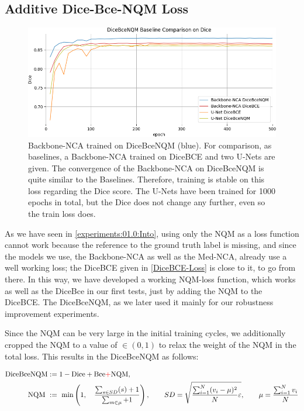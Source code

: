 \subsection{Additive Dice-Bce-NQM Loss}
\label{experiments:02.1:diceBce+NQM}
\begin{figure}[h!]
    \vspace{0.5cm}
    \centering
        \includegraphics[width=\linewidth]{Graphics/Experiments/2.1_inverted_freeAxes_Loss_DiceLoss()_test_mask0.png}
        \caption{Backbone-NCA trained on DiceBceNQM (blue). For comparison, as baselines, a Backbone-NCA trained on DiceBCE and two U-Nets are given. The convergence of the Backbone-NCA on DiceBceNQM is quite similar to the Baselines. Therefore, training is stable on this loss regarding the Dice score. The U-Nets have been trained for 1000 epochs in total, but the Dice does not change any further, even so the train loss does.}
    \label{fig:02.1:DiceBceNQM:Baselines:onDice}
\end{figure}

As we have seen in \autoref{experiments:01.0:Into}, using only the NQM as a loss function cannot work because the reference to the ground truth label is missing, and since the models we use, the Backbone-NCA as well as the Med-NCA, already use a well working loss; the DiceBCE given in \ref{DiceBCE-Loss} is close to it, to go from there. In this way, we have developed a working NQM-loss function, which works as well as the DiceBce in our first tests, just by adding the NQM to the DiceBCE. The DiceBceNQM, as we later used it mainly for our robustness improvement experiments.

Since the NQM can be very large in the initial training cycles, we additionally cropped the NQM to a value of $\in(0,1)$ to relax the weight of the NQM in the total loss. This results in the DiceBceNQM as follows:

\begin{align}
    \text{DiceBceNQM} &:= 1 - \mathrm{Dice} + \mathrm{Bce} {\color{red}+} \mathrm{NQM},\label{eq:02.1:DiceBceNQM}\\           
    \mathrm{NQM}\ &:=\ \min\left(1, \quad \frac{\sum_{s\in SD} (s) +1} {\sum_{m\in\mu} +1}\right), \qquad
    SD = \sqrt{\frac{\sum^N_{i=1}(v_i-\mu)^2}  {N}  \varepsilon}, \qquad
    \mu = \frac{\sum^N_{i=1}v_i}  {N}               \label{eq:02.1:Only_NQM}
\end{align}


